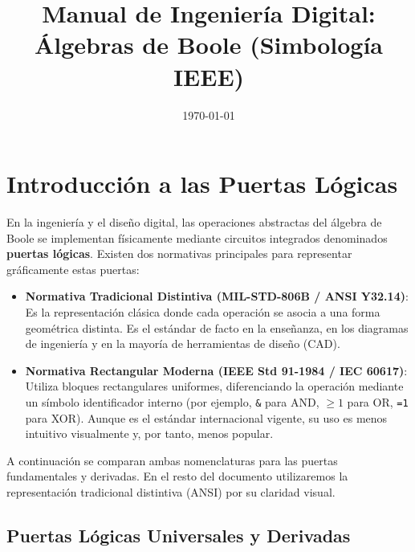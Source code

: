 \documentclass[12pt,a4paper]{article}
\title{Manual de Ingeniería Digital: Álgebras de Boole (Simbología IEEE)}
\author{}
\date{\today}
\begin{document}
\maketitle

\tableofcontents
\newpage

\section{Introducción a las Puertas Lógicas}

En la ingeniería y el diseño digital, las operaciones abstractas del álgebra de Boole se implementan físicamente mediante circuitos integrados denominados \textbf{puertas lógicas}. 
Existen dos normativas principales para representar gráficamente estas puertas:

\begin{itemize}
    \item \textbf{Normativa Tradicional Distintiva (MIL-STD-806B / ANSI Y32.14)}: Es la representación clásica donde cada operación se asocia a una forma geométrica distinta. Es el estándar de facto en la enseñanza, en los diagramas de ingeniería y en la mayoría de herramientas de diseño (CAD).
    \item \textbf{Normativa Rectangular Moderna (IEEE Std 91-1984 / IEC 60617)}: Utiliza bloques rectangulares uniformes, diferenciando la operación mediante un símbolo identificador interno (por ejemplo, \texttt{\&} para AND, \texttt{$\ge 1$} para OR, \texttt{=1} para XOR). Aunque es el estándar internacional vigente, su uso es menos intuitivo visualmente y, por tanto, menos popular.
\end{itemize}

A continuación se comparan ambas nomenclaturas para las puertas fundamentales y derivadas. En el resto del documento utilizaremos la representación tradicional distintiva (ANSI) por su claridad visual.

\subsection{Puertas Lógicas Universales y Derivadas}
\end{document}
